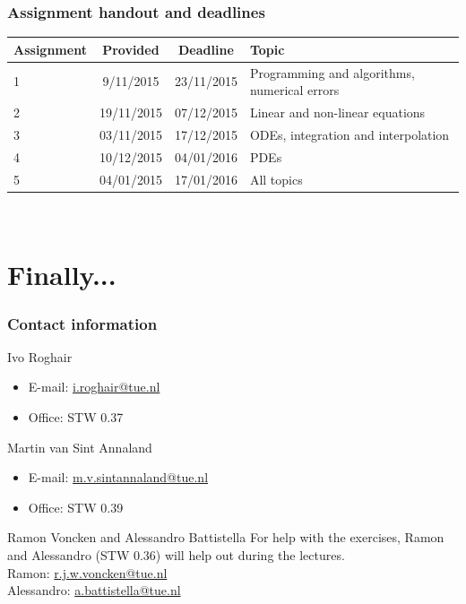 \documentclass[11pt,table,final,fleqn,xcolor={usenames,dvipsnames}]{beamer}
\begin{document}
\begin{frame}
 \frametitle{Assignment handout and deadlines}
 \begin{tabular}{p{}ccp{}}
 \hline
 Assign\-ment & Provided & Deadline & Topic \\ 
 \hline
  1 & 9/11/2015 & 23/11/2015 & Programming and algorithms, numerical errors \\ 
 2 & 19/11/2015 & \alert{07/12/2015} & Linear and non-linear equations  \\ 
 3 & \alert{03/11/2015} & \alert{17/12/2015} & ODEs, integration and interpolation \\
 4 & 10/12/2015 & 04/01/2016 & PDEs \\ 
 5 & 04/01/2015 & 17/01/2016 & All topics \\ 
 \hline
 \end{tabular} 
 \\
 \vspace*{1em}
\end{frame}

\section{Finally...}
\begin{frame}
 \frametitle{Contact information}
 \begin{block}{Ivo Roghair}
  \begin{itemize}
   \item E-mail: \href{mailto:i.roghair@tue.nl}{i.roghair@tue.nl}
   \item Office: STW 0.37
   \end{itemize} 
 \end{block}
 \vspace{1em}
  \begin{block}{Martin van Sint Annaland}
  \begin{itemize}
   \item E-mail: \href{mailto:m.v.sintannaland@tue.nl}{m.v.sintannaland@tue.nl}
   \item Office: STW 0.39 
   \end{itemize} 
 \end{block}
 \begin{block}{Ramon Voncken and Alessandro Battistella}
    For help with the exercises, Ramon and Alessandro (STW 0.36) will help out during the lectures.\\
    Ramon: \href{mailto:r.j.w.voncken@tue.nl}{r.j.w.voncken@tue.nl}\\
    Alessandro: \href{mailto:a.battistella@tue.nl}{a.battistella@tue.nl}
  \end{block}
\end{frame}
\end{document}
